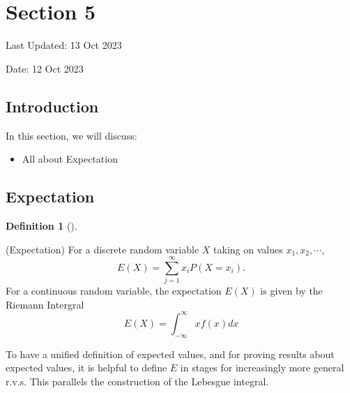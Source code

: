 \documentclass[
  letterpaper,
  DIV=11,
  numbers=noendperiod]{scrreprt}
\providecommand{\tightlist}{%
  \setlength{\itemsep}{0pt}\setlength{\parskip}{0pt}}\usepackage{longtable,booktabs,array}
\theoremstyle{definition}
\newtheorem{definition}{Definition}[chapter]
\theoremstyle{plain}
\theoremstyle{remark}
\begin{document}

\hypertarget{section-5}{%
\chapter*{Section 5}\label{section-5}}


Last Updated: 13 Oct 2023

Date: 12 Oct 2023

\hypertarget{introduction-4}{%
\section*{Introduction}\label{introduction-4}}


In this section, we will discuss:

\begin{itemize}
\tightlist
\item
  All about Expectation
\end{itemize}

\hypertarget{expectation}{%
\section*{Expectation}\label{expectation}}


\leavevmode{}%
\begin{definition}[]\label{def-expectation}

(Expectation) For a discrete random variable \(X\) taking on values
\(x_1, x_2, \cdots\), \[E(X)=\sum_{j=1}^{\infty} x_i P(X=x_i).\] For a
continuous random variable, the expectation \(E(X)\) is given by the
Riemann Intergral \[E(X)= \int_{-\infty}^{\infty} xf(x) dx\]

\end{definition}

To have a unified definition of expected values, and for proving results
about expected values, it is helpful to define \(E\) in stages for
increasingly more general r.v.s. This parallels the construction of the
Lebesgue integral.
\end{document}
